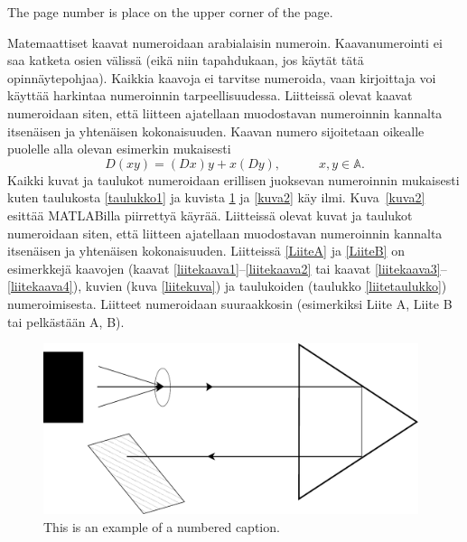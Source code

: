 \documentclass[english, 12pt, a4paper, elec, utf8, a-1b, online]{aaltothesis}
\begin{document}
The page number is place on the upper corner of the page.

Matemaattiset kaavat numeroidaan arabialaisin
numeroin. Kaavanumerointi ei saa katketa osien v\"aliss\"a (eik\"a niin
tapahdukaan, jos k\"ayt\"at t\"at\"a opinn\"aytepohjaa). Kaikkia kaavoja ei tarvitse
numeroida, vaan kirjoittaja voi k\"aytt\"a\"a harkintaa numeroinnin
tarpeellisuudessa.  Liitteiss\"a olevat kaavat numeroidaan siten, ett\"a
liitteen ajatellaan muodostavan numeroinnin kannalta itsen\"aisen ja
yhten\"aisen kokonaisuuden. Kaavan numero sijoitetaan oikealle puolelle
alla olevan esimerkin mukaisesti
\begin{equation}
D(xy) = (Dx)y + x(Dy),  \hspace{3em} x,y \in \mathbb{A}.
\end{equation}
Kaikki kuvat ja taulukot numeroidaan erillisen juoksevan numeroinnin
mukaisesti kuten taulukosta \ref{taulukko1} ja kuvista \ref{kuva1} ja
\ref{kuva2} k\"ay ilmi. Kuva~\ref{kuva2} esittää MATLABilla piirrettyä käyrää. 
Liitteiss\"a olevat kuvat ja taulukot numeroidaan siten, ett\"a
liitteen ajatellaan muodostavan numeroinnin kannalta itsen\"aisen ja
yhten\"aisen kokonaisuuden. Liitteiss\"a \ref{LiiteA} ja \ref{LiiteB} on
esimerkkej\"a kaavojen (kaavat \ref{liitekaava1}--\ref{liitekaava2} tai
kaavat \ref{liitekaava3}--\ref{liitekaava4}), kuvien (kuva
\ref{liitekuva}) ja taulukoiden (taulukko \ref{liitetaulukko})
numeroimisesta.  Liitteet numeroidaan suuraakkosin (esimerkiksi Liite
A, Liite B tai pelk\"ast\"a\"an A, B).
\begin{figure}[htb]
\centering
\includegraphics[height=5cm]{./linediagram.pdf}
\caption{This is an example of a numbered caption. \label{kuva1}}
\end{figure}
\end{document}
